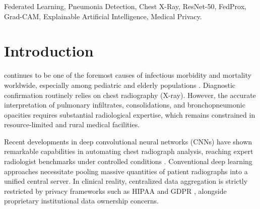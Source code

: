 \documentclass[journal]{IEEEtran}
\begin{document}
\begin{IEEEkeywords}
Federated Learning, Pneumonia Detection, Chest X-Ray, ResNet-50, FedProx, Grad-CAM, Explainable Artificial Intelligence, Medical Privacy.
\end{IEEEkeywords}

\section{Introduction}
 continues to be one of the foremost causes of infectious morbidity and mortality worldwide, especially among pediatric and elderly populations \cite{wang2017chestxray8}. Diagnostic confirmation routinely relies on chest radiography (X-ray). However, the accurate interpretation of pulmonary infiltrates, consolidations, and bronchopneumonic opacities requires substantial radiological expertise, which remains constrained in resource-limited and rural medical facilities.

Recent developments in deep convolutional neural networks (CNNs) have shown remarkable capabilities in automating chest radiograph analysis, reaching expert radiologist benchmarks under controlled conditions \cite{rajpurkar2017chexnet, irvin2019chexpert}. Conventional deep learning approaches necessitate pooling massive quantities of patient radiographs into a unified central server. In clinical reality, centralized data aggregation is strictly restricted by privacy frameworks such as HIPAA \cite{hipaa1996, hhs2003} and GDPR \cite{gdpr2016}, alongside proprietary institutional data ownership concerns.
\end{document}
